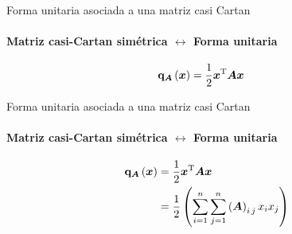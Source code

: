 \documentclass[spanish]{beamer}
\begin{document}

\begin{frame}{Forma unitaria asociada a una matriz casi Cartan}
  \framesubtitle{Matriz casi-Cartan simétrica $\leftrightarrow$ Forma unitaria}
  \begin{align*}
    \Quadratic{\mat{A}}\left(\vec{x}\right) &= \frac{1}{2} 
    \transpose{\vec{x}} \mat{A} \vec{x}  %
  \end{align*}
\end{frame}

\begin{frame}{Forma unitaria asociada a una matriz casi Cartan}
  \framesubtitle{Matriz casi-Cartan simétrica $\leftrightarrow$ Forma unitaria}
  \begin{align*}
    \Quadratic{\mat{A}}\left(\vec{x}\right) &= \frac{1}{2} 
    \transpose{\vec{x}} \mat{A} \vec{x}  \\
    &= \frac{1}{2} \left( \sum_{i = 1}^{n} \sum_{j = 1}^{n} 
      \entry{\mat{A}}{i}{j} x_i x_j \right)  %
  \end{align*}
\end{frame}
\end{document}
